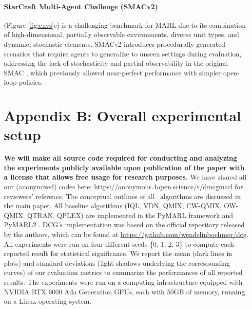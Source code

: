 \paragraph{StarCraft Multi-Agent Challenge (SMACv2)} (Figure \ref{fig:envs}e) is a challenging benchmark for MARL due to its combination of high-dimensional, partially observable environments, diverse unit types, and dynamic, stochastic elements. SMACv2 \cite{ellis2023smacv} introduces procedurally generated scenarios that require agents to generalize to unseen settings during evaluation, addressing the lack of stochasticity and partial observability in the original SMAC \cite{samvelyan2019starcraft}, which previously allowed near-perfect performance with simpler open-loop policies. 

\section*{Appendix B: Overall experimental setup} 

\textbf{We will make all source code required for conducting and analyzing the experiments publicly available upon publication of the paper with a license that allows free usage for research purposes. } We have shared all our (anonymized) codes here: {\color{blue}\url{https://anonymous.4open.science/r/dmcgmarl}} for reviewers' reference. The conceptual outlines of all \algoabb\ algorithms are discussed in the main paper. All baseline algorithms (IQL, VDN, QMIX, CW-QMIX, OW-QMIX, QTRAN, QPLEX) are implemented in the PyMARL framework \cite{rashid2018qmix} and PyMARL2 \cite{hu2023rethinking}. DCG's implementation was based on the official repository released by the authors, which can be found at \url{https://github.com/wendelinboehmer/dcg}. 
All experiments were run on four different seeds \{0, 1, 2, 3\} to compute each reported result for statistical significance. We report the mean (dark lines in plots) and standard deviations (light shadows underlying the corresponding curves) of our evaluation metrics to summarize the performances of all reported results. The experiments were run on a computing infrastructure equipped with NVIDIA RTX 6000 Ada Generation GPUs, each with 50GB of memory, running on a Linux operating system.



